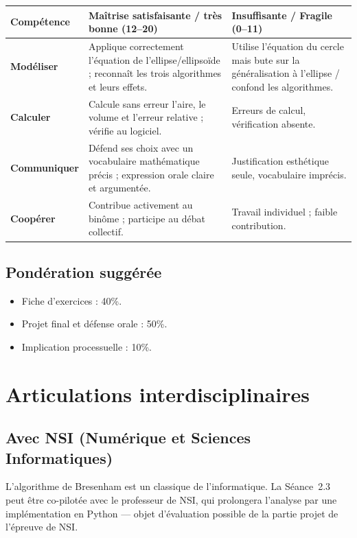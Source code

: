 \documentclass[12pt,a4paper]{scrartcl}
\begin{document}
\begin{center}
\small
\begin{tabularx}{\textwidth}{@{}p{}XX@{}}
\toprule
\textbf{Compétence} & \textbf{Maîtrise satisfaisante / très bonne (12--20)} & \textbf{Insuffisante / Fragile (0--11)} \\
\midrule
\textbf{Modéliser} & Applique correctement l'équation de l'ellipse/ellipsoïde ; reconnaît les trois algorithmes et leurs effets. & Utilise l'équation du cercle mais bute sur la généralisation à l'ellipse / confond les algorithmes. \\
\addlinespace[3pt]
\textbf{Calculer} & Calcule sans erreur l'aire, le volume et l'erreur relative ; vérifie au logiciel. & Erreurs de calcul, vérification absente. \\
\addlinespace[3pt]
\textbf{Communiquer} & Défend ses choix avec un vocabulaire mathématique précis ; expression orale claire et argumentée. & Justification esthétique seule, vocabulaire imprécis. \\
\addlinespace[3pt]
\textbf{Coopérer} & Contribue activement au binôme ; participe au débat collectif. & Travail individuel ; faible contribution. \\
\bottomrule
\end{tabularx}
\end{center}

\subsection{Pondération suggérée}
\begin{itemize}[leftmargin=1.3em,itemsep=0.1em,topsep=0.2em,nosep]
  \item Fiche d'exercices : 40\%.
  \item Projet final et défense orale : 50\%.
  \item Implication processuelle : 10\%.
\end{itemize}

\section{Articulations interdisciplinaires}

\subsection{Avec NSI (Numérique et Sciences Informatiques)}
L'algorithme de Bresenham est un classique de l'informatique. La Séance~2.3 peut être co-pilotée avec le professeur de NSI, qui prolongera l'analyse par une implémentation en Python --- objet d'évaluation possible de la partie projet de l'épreuve de NSI.
\end{document}
